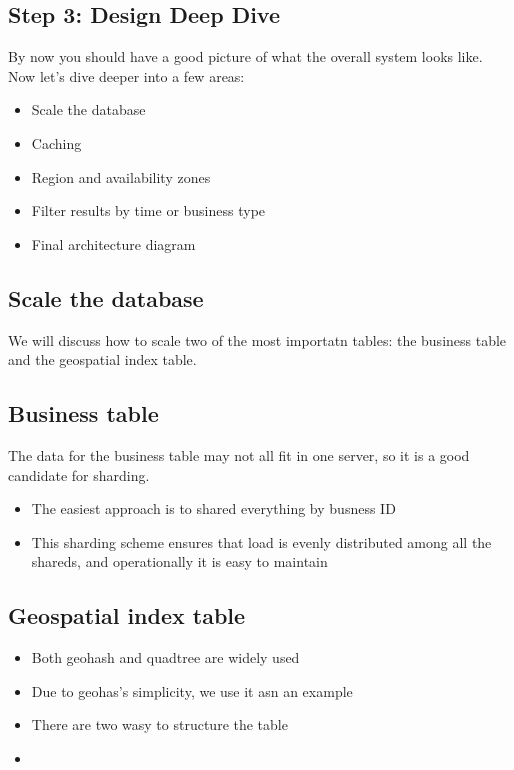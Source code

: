 \documentclass{report}
\theoremstyle{definition}
\let\oldsubsection\subsection
\renewcommand{\subsection}{\oldsubsection*}
\begin{document}
\subsection{Step 3: Design Deep Dive}

By now you should have a good picture of what the overall system looks like. Now let's dive deeper into a few areas:

\begin{itemize}
\item
Scale the database
\item
Caching
\item
Region and availability zones
\item
Filter results by time or business type
\item
Final architecture diagram
\end{itemize}

\subsection{Scale the database}

We will discuss how to scale two of the most importatn tables: the business table and the geospatial index table.

\subsection{Business table}

The data for the business table may not all fit in one server, so it is a good candidate for sharding.

\begin{itemize}
\item
The easiest approach is to shared everything by busness ID
\item
This sharding scheme ensures that load is evenly distributed among all the shareds, and operationally it is easy to maintain
\end{itemize}

\subsection{Geospatial index table}

\begin{itemize}
\item
Both geohash and quadtree are widely used
\item
Due to geohas's simplicity, we use it asn an example
\item
There are two wasy to structure the table
\item
\end{itemize}
\end{document}
